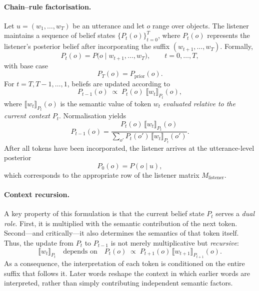 \documentclass[11pt, a4paper]{article}
\begin{document}
\paragraph{Chain--rule factorisation.}
Let $u=(w_1,\ldots,w_T)$ be an utterance and let $o$ range over objects.
The listener maintains a sequence of belief states $\{P_t(o)\}_{t=0}^T$, where $P_t(o)$ represents the listener's posterior belief after incorporating the suffix $(w_{t+1},\ldots,w_T)$.
Formally,
\begin{equation}
  P_t(o) = P\bigl(o \mid w_{t+1},\ldots,w_T\bigr), \qquad t=0,\ldots,T,
  \label{eq:listener_belief}
\end{equation}
with base case
\begin{equation}
  P_T(o) = P_{\mathrm{prior}}(o).
  \label{eq:listener_base}
\end{equation}
For $t = T,T-1,\ldots,1$, beliefs are updated according to
\begin{equation}
  P_{t-1}(o) \;\propto\; P_t(o)\;\llbracket w_t \rrbracket_{P_t}(o),
  \label{eq:comp}
\end{equation}
where $\llbracket w_t \rrbracket_{P_t}(o)$ is the semantic value of token $w_t$ \emph{evaluated relative to the current context} $P_t$.
Normalisation yields
\begin{equation}
  P_{t-1}(o) = \frac{P_t(o)\,\llbracket w_t \rrbracket_{P_t}(o)}{\sum_{o'} P_t(o')\,\llbracket w_t \rrbracket_{P_t}(o')}.
  \label{eq:comp_norm}
\end{equation}
After all tokens have been incorporated, the listener arrives at the utterance-level posterior
\begin{equation}
  P_0(o) = P(o \mid u),
  \label{eq:listener_final}
\end{equation}
which corresponds to the appropriate row of the listener matrix $M_{\text{listener}}$.

\paragraph{Context recursion.}
A key property of this formulation is that the current belief state $P_t$ serves a \emph{dual role}.
First, it is multiplied with the semantic contribution of the next token.
Second---and critically---it also determines the semantics of that token itself.
Thus, the update from $P_t$ to $P_{t-1}$ is not merely multiplicative but \emph{recursive}:
\begin{equation}
  \llbracket w_t \rrbracket_{P_t} \quad\text{depends on}\quad P_t(o) \;\propto\; P_{t+1}(o)\,\llbracket w_{t+1} \rrbracket_{P_{t+1}}(o).
  \label{eq:context_recursion}
\end{equation}
As a consequence, the interpretation of each token is conditioned on the entire suffix that follows it.
Later words reshape the context in which earlier words are interpreted, rather than simply contributing independent semantic factors.
\end{document}
